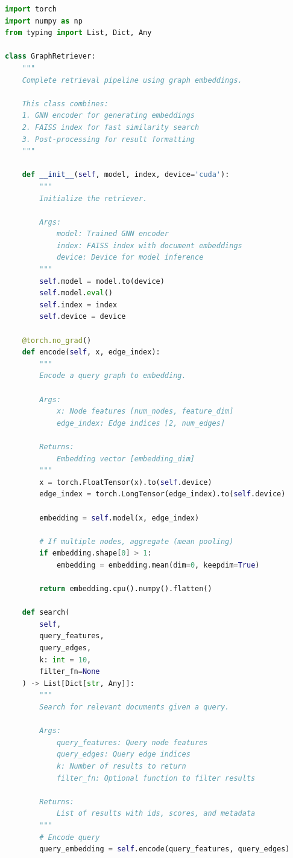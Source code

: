 \documentclass[12pt,a4paper]{article}
\begin{document}
\begin{lstlisting}[language=Python,caption={retrieval/search.py}]
import torch
import numpy as np
from typing import List, Dict, Any

class GraphRetriever:
    """
    Complete retrieval pipeline using graph embeddings.

    This class combines:
    1. GNN encoder for generating embeddings
    2. FAISS index for fast similarity search
    3. Post-processing for result formatting
    """

    def __init__(self, model, index, device='cuda'):
        """
        Initialize the retriever.

        Args:
            model: Trained GNN encoder
            index: FAISS index with document embeddings
            device: Device for model inference
        """
        self.model = model.to(device)
        self.model.eval()
        self.index = index
        self.device = device

    @torch.no_grad()
    def encode(self, x, edge_index):
        """
        Encode a query graph to embedding.

        Args:
            x: Node features [num_nodes, feature_dim]
            edge_index: Edge indices [2, num_edges]

        Returns:
            Embedding vector [embedding_dim]
        """
        x = torch.FloatTensor(x).to(self.device)
        edge_index = torch.LongTensor(edge_index).to(self.device)

        embedding = self.model(x, edge_index)

        # If multiple nodes, aggregate (mean pooling)
        if embedding.shape[0] > 1:
            embedding = embedding.mean(dim=0, keepdim=True)

        return embedding.cpu().numpy().flatten()

    def search(
        self,
        query_features,
        query_edges,
        k: int = 10,
        filter_fn=None
    ) -> List[Dict[str, Any]]:
        """
        Search for relevant documents given a query.

        Args:
            query_features: Query node features
            query_edges: Query edge indices
            k: Number of results to return
            filter_fn: Optional function to filter results

        Returns:
            List of results with ids, scores, and metadata
        """
        # Encode query
        query_embedding = self.encode(query_features, query_edges)


\end{lstlisting}
\end{document}
